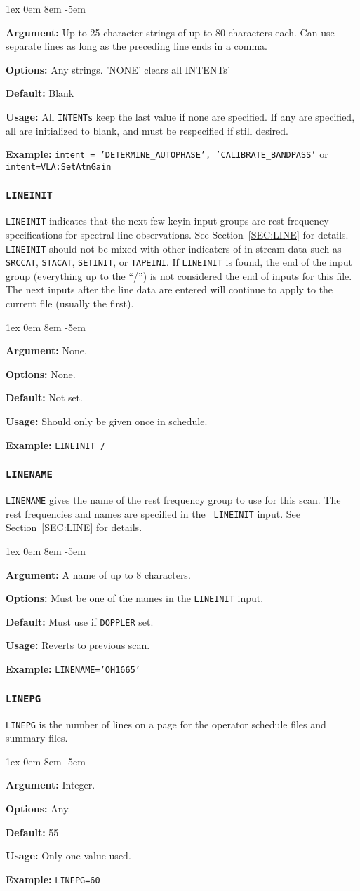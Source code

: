 \documentclass{report}
\newcommand{\rcwbox}[5]{
  \begin{list}{}{\parsep 1ex  \itemsep 0em
                 \leftmargin 8em  \itemindent -5em }
    \item {\bf Argument:} #1
    \item {\bf Options:}  #2
    \item {\bf Default:}  #3
    \item {\bf Usage:}    #4
    \item {\bf Example:}  #5
  \end{list}
}
\begin{document}
\rcwbox
{Up to 25 character strings of up to 80 characters each.  Can use 
separate lines as long as the preceding line ends in a comma.}
{Any strings.  'NONE' clears all INTENTs'}
{Blank}
{All {\tt INTENTs} keep the last value if none are specified.  If any
are specified, all are initialized to blank, and must be respecified
if still desired.}
{{\tt intent = 'DETERMINE\_AUTOPHASE', 'CALIBRATE\_BANDPASS'} or
{\tt intent=VLA:SetAtnGain}}


\subsubsection{\label{MP:LINEINIT}{\tt LINEINIT}}

{\tt LINEINIT} indicates that the next few keyin input groups are rest
frequency specifications for spectral line observations. See
Section~\ref{SEC:LINE} for details. {\tt LINEINIT} should not be
mixed with other indicaters of in-stream data such as {\tt SRCCAT},
{\tt STACAT}, {\tt SETINIT}, or {\tt TAPEINI}.  If {\tt LINEINIT}
is found, the end of the input group (everything up to the ``/'')
is not considered the end of inputs for this file.  The next inputs
after the line data are entered will continue to apply to the current
file (usually the first).

\rcwbox
{None.}
{None.}
{Not set.}
{Should only be given once in schedule.}
{{\tt LINEINIT /}}


\subsubsection{\label{MP:LINENAME}{\tt LINENAME}}

{\tt LINENAME} gives the name of the rest frequency group to use for
this scan. The rest frequencies and names are specified in the {\tt
LINEINIT} input. See Section~\ref{SEC:LINE} for details.

\rcwbox
{A name of up to 8 characters.}
{Must be one of the names in the {\tt LINEINIT} input.}
{Must use if {\tt DOPPLER} set.}
{Reverts to previous scan.}
{{\tt LINENAME='OH1665'}}


\subsubsection{\label{MP:LINEPG}{\tt LINEPG}}

{\tt LINEPG} is the number of lines on a page for the operator
schedule files and summary files.

\rcwbox
{Integer.}
{Any.}
{55}
{Only one value used.}
{{\tt LINEPG=60}}
\end{document}
